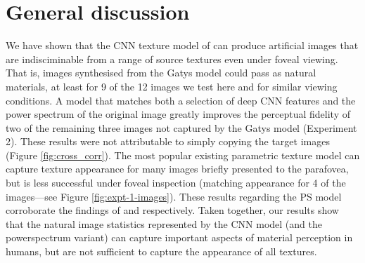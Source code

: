 \documentclass[article, 11pt,a4paper,natbib]{apa6}\usepackage[]{graphicx}\usepackage[]{color}
\begin{document}
\section{General discussion}

We have shown that the CNN texture model of \citet{gatys_texture_2015-1} can produce artificial images that are indisciminable from a range of source textures even under foveal viewing.
That is, images synthesised from the Gatys model could pass as natural materials, at least for 9 of the 12 images we test here and for similar viewing conditions.
A model that matches both a selection of deep CNN features and the power spectrum of the original image \citep{liu_texture_2016} greatly improves the perceptual fidelity of two of the remaining three images not captured by the Gatys model (Experiment 2).
These results were not attributable to simply copying the target images (Figure \ref{fig:cross_corr}).
The most popular existing parametric texture model \citep[PS;][]{portilla_parametric_2000} can capture texture appearance for many images briefly presented to the parafovea, but is less successful under foveal inspection (matching appearance for 4 of the images---see Figure \ref{fig:expt-1-images}).
These results regarding the PS model corroborate the findings of \citet{balas_texture_2006} and \citet{balas_contrast_2012} respectively.
Taken together, our results show that the natural image statistics represented by the CNN model (and the powerspectrum variant) can capture important aspects of material perception in humans, but are not sufficient to capture the appearance of all textures.
\end{document}
